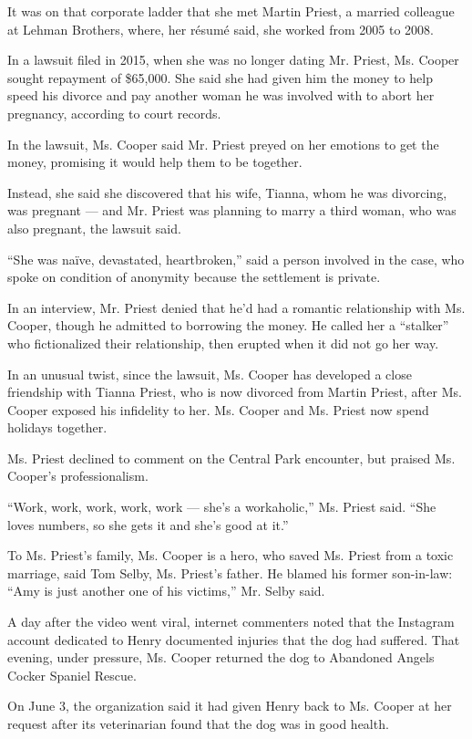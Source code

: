 It was on that corporate ladder that she met Martin Priest, a married
colleague at Lehman Brothers, where, her résumé said, she worked from
2005 to 2008.

In a lawsuit filed in 2015, when she was no longer dating Mr. Priest,
Ms. Cooper sought repayment of \$65,000. She said she had given him the
money to help speed his divorce and pay another woman he was involved
with to abort her pregnancy, according to court records.

In the lawsuit, Ms. Cooper said Mr. Priest preyed on her emotions to get
the money, promising it would help them to be together.

Instead, she said she discovered that his wife, Tianna, whom he was
divorcing, was pregnant --- and Mr. Priest was planning to marry a third
woman, who was also pregnant, the lawsuit said.

``She was naïve, devastated, heartbroken,'' said a person involved in
the case, who spoke on condition of anonymity because the settlement is
private.

In an interview, Mr. Priest denied that he'd had a romantic relationship
with Ms. Cooper, though he admitted to borrowing the money. He called
her a ``stalker'' who fictionalized their relationship, then erupted
when it did not go her way.

In an unusual twist, since the lawsuit, Ms. Cooper has developed a close
friendship with Tianna Priest, who is now divorced from Martin Priest,
after Ms. Cooper exposed his infidelity to her. Ms. Cooper and Ms.
Priest now spend holidays together.

Ms. Priest declined to comment on the Central Park encounter, but
praised Ms. Cooper's professionalism.

``Work, work, work, work, work --- she's a workaholic,'' Ms. Priest
said. ``She loves numbers, so she gets it and she's good at it.''

To Ms. Priest's family, Ms. Cooper is a hero, who saved Ms. Priest from
a toxic marriage, said Tom Selby, Ms. Priest's father. He blamed his
former son-in-law: ``Amy is just another one of his victims,'' Mr. Selby
said.

A day after the video went viral, internet commenters noted that the
Instagram account dedicated to Henry documented injuries that the dog
had suffered. That evening, under pressure, Ms. Cooper returned the dog
to Abandoned Angels Cocker Spaniel Rescue.

On June 3, the organization said it had given Henry back to Ms. Cooper
at her request after its veterinarian found that the dog was in good
health.


